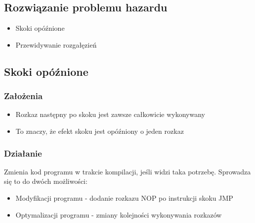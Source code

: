 \documentclass[a4paper,twoside]{article}
\begin{document}
    	\subsection*{Rozwiązanie problemu hazardu}
    	\begin{itemize}
    		\item Skoki opóźnione
    		\item Przewidywanie rozgałęzień
    	\end{itemize}
    	\subsection*{Skoki opóźnione}
    	\subsubsection*{Założenia}
    	\begin{itemize}
    		\item Rozkaz następny po skoku jest zawsze całkowicie wykonywany
    		\item To znaczy, że efekt skoku jest opóźniony o jeden rozkaz
    	\end{itemize}
    	\subsubsection*{Działanie}
    	Zmienia kod programu w trakcie kompilacji, jeśli widzi taka potrzebę. Sprowadza się to do dwóch możliwości:
    	\begin{itemize}
    		\item Modyfikacji programu - dodanie rozkazu NOP po instrukcji skoku JMP
    		\item Optymalizacji programu - zmiany kolejności wykonywania rozkazów
    	\end{itemize}
\end{document}
